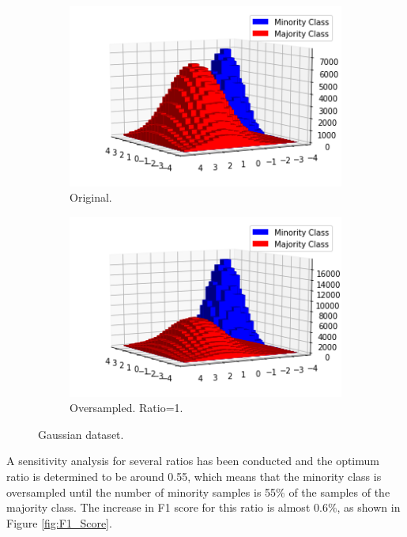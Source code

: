 \documentclass[conference]{IEEEtran}
\begin{document}
	
		\begin{figure}[h]
		\centering
		\begin{subfigure}[h]{0.24\textwidth}
			\centering
			\includegraphics[width=\textwidth]{Oversampling_2D_OriginalDataset}
			\caption{Original.}
			\label{fig:Oversampling_2D_OriginalDataset}
		\end{subfigure}
		\hfill
		\begin{subfigure}[h]{0.24\textwidth}
			\centering
			\includegraphics[width=\textwidth]{Oversampling_2D_OversampledDataset}
			\caption{Oversampled. Ratio=1.}
			\label{fig:Oversampling_2D_OversampledDataset}
		\end{subfigure}
		\caption{Gaussian dataset.}
		\label{fig:Oversampling_2D_OriginalHistograms}
	\end{figure}
	
	A sensitivity analysis for several ratios has been conducted and the optimum ratio is determined to be around 0.55, which means that the minority class is oversampled until the number of minority samples is 55\% of the samples of the majority class. The increase in F1 score for this ratio is almost 0.6\%, as shown in Figure \ref{fig:F1_Score}.
\end{document}
